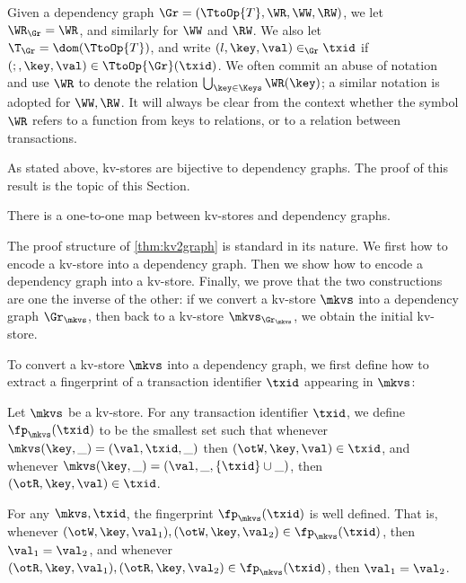 Given a dependency graph $\Gr = (\TtoOp{T}, \WR, \WW, \RW)$, we 
let $\WR_{\Gr} = \WR$, and similarly for $\WW$ and $\RW$. We also let $
\T_{\Gr} = \dom(\TtoOp{T})$, and write $(l, \key, \val) \in_{\Gr} \txid$ if 
$(;, \key, \val) \in \TtoOp{\Gr}(\txid)$. We
often 
commit an abuse of notation and use $\WR$ to denote the relation 
$\bigcup_{\key \in \Keys} \WR(\key)$; a similar notation is adopted for $\WW, \RW$. 
It will always be clear from the context whether the symbol $\WR$ refers to a function 
from keys to relations, or to a relation between transactions. 

As stated above, kv-stores are bijective to dependency graphs. The proof 
of this result is the topic of this Section. 

\begin{theorem}
\label{thm:kv2graph}
There is a one-to-one map between kv-stores and dependency graphs.
\end{theorem}
The proof structure of \cref{thm:kv2graph} is standard in its nature. 
We first how to encode a kv-store into a dependency graph. Then we 
show how to encode a dependency graph into a kv-store. Finally, 
we prove that the two constructions are one the inverse of the other: 
if we convert a kv-store $\mkvs$ into a dependency graph $\Gr_{\mkvs}$, 
then back to a kv-store $\mkvs_{\Gr_{\mkvs}}$, we obtain the initial kv-store.

To convert a kv-store $\mkvs$ into a dependency graph, we first define how 
to extract a fingerprint of a transaction identifier $\txid$ appearing in $\mkvs$:
\begin{definition}
\label{def:mkvs_fingerprint}
Let $\mkvs$ be a kv-store. For any transaction identifier $\txid$, we define 
$\fp_{\mkvs}(\txid)$ to be the smallest set such that whenever 
$\mkvs(\key, \_) = (\val, \txid, \_)$ then $(\otW, \key, \val) \in \txid$, and 
whenever $\mkvs(\key, \_) = (\val, \_, \{\txid\} \cup \_)$, then $(\otR, \key, \val) \in \txid$. 
\end{definition}
\begin{proposition}
\label{prop:mkvs_fp_welldefined}
For any $\mkvs, \txid$, the fingerprint $\fp_{\mkvs}(\txid)$ is well defined. 
That is, whenever $(\otW,\key,\val_1), (\otW,\key,\val_2) \in \fp_{\mkvs}(\txid)$, 
then $\val_1 = \val_2$, and whenever $(\otR, \key, \val_1), (\otR,\key, \val_2) \in \fp_{\mkvs}(\txid)$, 
then $\val_1 = \val_2$.
\end{proposition}

